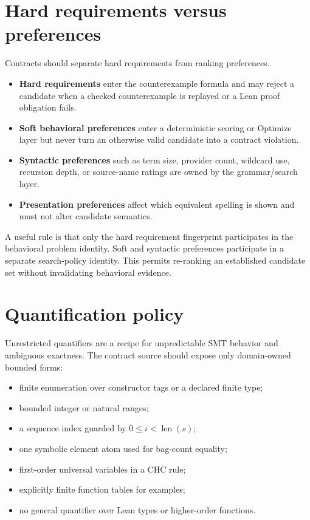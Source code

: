\documentclass[11pt,oneside]{report}
\begin{document}
\section{Hard requirements versus preferences}

Contracts should separate hard requirements from ranking preferences.

\begin{itemize}[leftmargin=2em]
\item \textbf{Hard requirements} enter the counterexample formula and may reject a candidate when a checked counterexample is replayed or a Lean proof obligation fails.
\item \textbf{Soft behavioral preferences} enter a deterministic scoring or Optimize layer but never turn an otherwise valid candidate into a contract violation.
\item \textbf{Syntactic preferences} such as term size, provider count, wildcard use, recursion depth, or source-name ratings are owned by the grammar/search layer.
\item \textbf{Presentation preferences} affect which equivalent spelling is shown and must not alter candidate semantics.
\end{itemize}

A useful rule is that only the hard requirement fingerprint participates in the behavioral problem identity. Soft and syntactic preferences participate in a separate search-policy identity. This permits re-ranking an established candidate set without invalidating behavioral evidence.

\section{Quantification policy}

Unrestricted quantifiers are a recipe for unpredictable SMT behavior and ambiguous exactness. The contract source should expose only domain-owned bounded forms:

\begin{itemize}[leftmargin=2em]
\item finite enumeration over constructor tags or a declared finite type;
\item bounded integer or natural ranges;
\item a sequence index guarded by $0\le i<\operatorname{len}(s)$;
\item one symbolic element atom used for bag-count equality;
\item first-order universal variables in a CHC rule;
\item explicitly finite function tables for examples;
\item no general quantifier over Lean types or higher-order functions.
\end{itemize}
\end{document}
